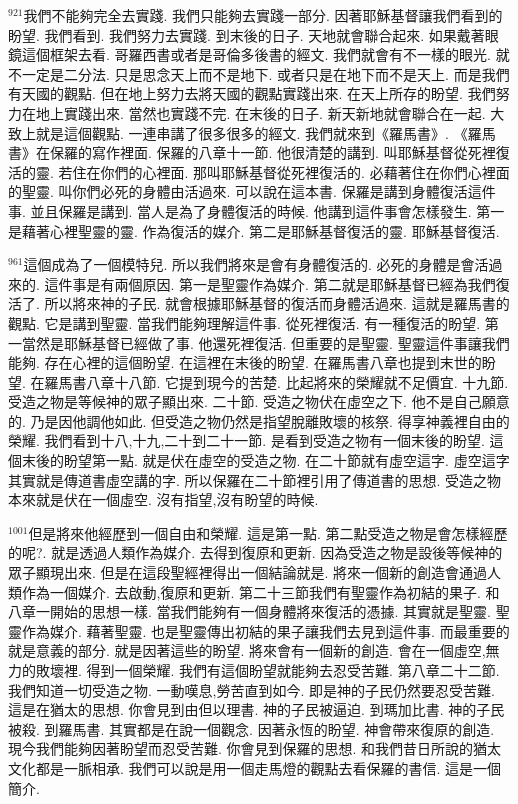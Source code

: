 \documentclass{book}
\begin{document}
$^{921}$我們不能夠完全去實踐.
我們只能夠去實踐一部分.
因著耶穌基督讓我們看到的盼望.
我們看到.
我們努力去實踐.
到末後的日子.
天地就會聯合起來.
如果戴著眼鏡這個框架去看.
哥羅西書或者是哥倫多後書的經文.
我們就會有不一樣的眼光.
就不一定是二分法.
只是思念天上而不是地下.
或者只是在地下而不是天上.
而是我們有天國的觀點.
但在地上努力去將天國的觀點實踐出來.
在天上所存的盼望.
我們努力在地上實踐出來.
當然也實踐不完.
在末後的日子.
新天新地就會聯合在一起.
大致上就是這個觀點.
一連串講了很多很多的經文.
我們就來到《羅馬書》.
《羅馬書》在保羅的寫作裡面.
保羅的八章十一節.
他很清楚的講到.
叫耶穌基督從死裡復活的靈.
若住在你們的心裡面.
那叫耶穌基督從死裡復活的.
必藉著住在你們心裡面的聖靈.
叫你們必死的身體由活過來.
可以說在這本書.
保羅是講到身體復活這件事.
並且保羅是講到.
當人是為了身體復活的時候.
他講到這件事會怎樣發生.
第一是藉著心裡聖靈的靈.
作為復活的媒介.
第二是耶穌基督復活的靈.
耶穌基督復活.

$^{961}$這個成為了一個模特兒.
所以我們將來是會有身體復活的.
必死的身體是會活過來的.
這件事是有兩個原因.
第一是聖靈作為媒介.
第二就是耶穌基督已經為我們復活了.
所以將來神的子民.
就會根據耶穌基督的復活而身體活過來.
這就是羅馬書的觀點.
它是講到聖靈.
當我們能夠理解這件事.
從死裡復活.
有一種復活的盼望.
第一當然是耶穌基督已經做了事.
他還死裡復活.
但重要的是聖靈.
聖靈這件事讓我們能夠.
存在心裡的這個盼望.
在這裡在末後的盼望.
在羅馬書八章也提到末世的盼望.
在羅馬書八章十八節.
它提到現今的苦楚.
比起將來的榮耀就不足價宜.
十九節.
受造之物是等候神的眾子顯出來.
二十節.
受造之物伏在虛空之下.
他不是自己願意的.
乃是因他調他如此.
但受造之物仍然是指望脫離敗壞的核祭.
得享神義裡自由的榮耀.
我們看到十八,十九,二十到二十一節.
是看到受造之物有一個末後的盼望.
這個末後的盼望第一點.
就是伏在虛空的受造之物.
在二十節就有虛空這字.
虛空這字其實就是傳道書虛空講的字.
所以保羅在二十節裡引用了傳道書的思想.
受造之物本來就是伏在一個虛空.
沒有指望,沒有盼望的時候.

$^{1001}$但是將來他經歷到一個自由和榮耀.
這是第一點.
第二點受造之物是會怎樣經歷的呢?.
就是透過人類作為媒介.
去得到復原和更新.
因為受造之物是設後等候神的眾子顯現出來.
但是在這段聖經裡得出一個結論就是.
將來一個新的創造會通過人類作為一個媒介.
去啟動,復原和更新.
第二十三節我們有聖靈作為初結的果子.
和八章一開始的思想一樣.
當我們能夠有一個身體將來復活的憑據.
其實就是聖靈.
聖靈作為媒介.
藉著聖靈.
也是聖靈傳出初結的果子讓我們去見到這件事.
而最重要的就是意義的部分.
就是因著這些的盼望.
將來會有一個新的創造.
會在一個虛空,無力的敗壞裡.
得到一個榮耀.
我們有這個盼望就能夠去忍受苦難.
第八章二十二節.
我們知道一切受造之物.
一動嘆息,勞苦直到如今.
即是神的子民仍然要忍受苦難.
這是在猶太的思想.
你會見到由但以理書.
神的子民被逼迫.
到瑪加比書.
神的子民被殺.
到羅馬書.
其實都是在說一個觀念.
因著永恆的盼望.
神會帶來復原的創造.
現今我們能夠因著盼望而忍受苦難.
你會見到保羅的思想.
和我們昔日所說的猶太文化都是一脈相承.
我們可以說是用一個走馬燈的觀點去看保羅的書信.
這是一個簡介.
\end{document}

